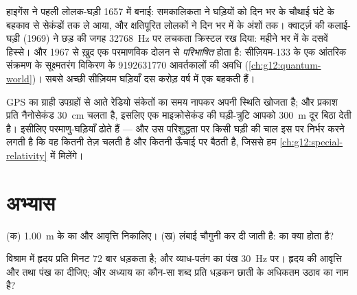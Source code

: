 \begin{example}[टिक की तीन सदियाँ]\label{ex:g12:oscillators-and-time:clocks}
हाइगेंस ने पहली लोलक-घड़ी \num{1657} में बनाई: समकालिकता ने घड़ियों को दिन भर के
चौथाई घंटे के बहकाव से सेकंडों तक ले आया, और क्षतिपूरित लोलकों ने दिन भर में
 के अंशों तक। क्वार्ट्ज़ की कलाई-घड़ी (\num{1969}) ने छड़ की जगह \qty{32768}{Hz} पर
लचकता क्रिस्टल रख दिया: महीने भर में  के दसवें हिस्से। और \num{1967} से
 ख़ुद एक परमाणविक दोलन से \emph{परिभाषित} होता है: सीज़ियम-133 के एक
आंतरिक संक्रमण के सूक्ष्मतरंग विकिरण के \num{9192631770} आवर्तकालों की अवधि
(\cref{ch:g12:quantum-world})। सबसे अच्छी सीज़ियम घड़ियाँ दस करोड़ वर्ष में एक  बहकती हैं।
\end{example}

\begin{remark}[नैनोसेकंड के पीछे क्यों]\label{rem:g12:oscillators-and-time:gps}
GPS का ग्राही उपग्रहों से आते रेडियो संकेतों का समय नापकर
अपनी स्थिति खोजता है; और प्रकाश प्रति नैनोसेकंड \qty{30}{cm} चलता है, इसलिए एक
माइक्रोसेकंड की घड़ी-त्रुटि आपको \qty{300}{m} दूर बिठा देती है। इसीलिए
 परमाणु-घड़ियाँ ढोते हैं --- और उस परिशुद्धता पर किसी घड़ी की चाल
इस पर निर्भर करने लगती है कि वह कितनी तेज़ चलती है और कितनी ऊँचाई पर बैठती है,
जिससे हम \cref{ch:g12:special-relativity} में मिलेंगे।
\end{remark}

\section{अभ्यास}

\begin{exercise}[$\star$]\label{exo:g12:oscillators-and-time:1}
(क) \qty{1.00}{m} के  का  और आवृत्ति
निकालिए। (ख) लंबाई चौगुनी कर दी जाती है:  का क्या होता है?
\end{exercise}

\begin{exercise}[$\star$]\label{exo:g12:oscillators-and-time:2}
विश्राम में हृदय प्रति मिनट $72$ बार धड़कता है; और व्याध-पतंग का पंख
\qty{30}{Hz} पर। हृदय की आवृत्ति और  तथा पंख का
 दीजिए; और अध्याय का कौन-सा शब्द प्रति धड़कन छाती के अधिकतम
उठाव का नाम है?
\end{exercise}

